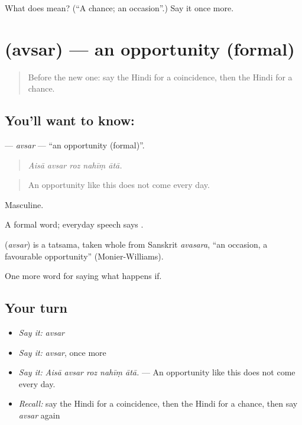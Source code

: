 \begin{tcolorbox}[breakable,colback=teal!4,colframe=teal!35!black,title={Before you move on}]
What does  mean? (\textquotedblleft{}A chance; an occasion\textquotedblright{}.) Say it once more.
\end{tcolorbox}
\section[\texorpdfstring{\hi{अवसर} (avsar)}{अवसर (avsar)}]{ (avsar) — an opportunity (formal)}

\label{lesson:HI-C544-avsar}



\begin{quote}
Before the new one: say the Hindi for a coincidence, then the Hindi for a chance.
\end{quote}

\subsection*{You'll want to know: }
\textbf{} — \emph{avsar} — \textquotedblleft{}an opportunity (formal)\textquotedblright{}.

\begin{quote}
    
\end{quote}

\begin{quote}
\emph{Aisā avsar roz nahīṃ ātā.}
\end{quote}

\begin{quote}
An opportunity like this does not come every day.
\end{quote}

Masculine.

A formal word; everyday speech says .

\begin{cousinweb}
\textbf{} (\emph{avsar}) is a tatsama, taken whole from Sanskrit \emph{avasara}, \textquotedblleft{}an occasion, a favourable opportunity\textquotedblright{} (Monier-Williams).
\end{cousinweb}

\begin{grammarlens}[title={What you've built}]
One more word for saying what happens if.
\end{grammarlens}

\subsection*{Your turn}
\begin{itemize}
\raggedright
  \item \emph{Say it:} \emph{avsar}
  \item \emph{Say it:} \emph{avsar}, once more
  \item \emph{Say it:} \emph{Aisā avsar roz nahīṃ ātā.} — An opportunity like this does not come every day.
  \item \emph{Recall:} say the Hindi for a coincidence, then the Hindi for a chance, then say \emph{avsar} again
\end{itemize}

